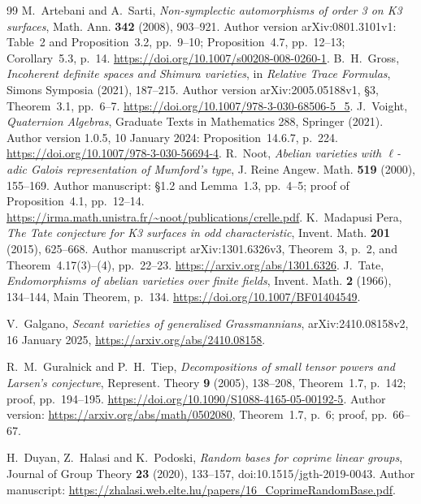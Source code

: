 \documentclass[11pt]{article}
\theoremstyle{definition}
\theoremstyle{remark}
\begin{document}
\begin{thebibliography}{99}
 M.~Artebani and A.~Sarti, \emph{Non-symplectic automorphisms of order 3 on K3 surfaces}, Math. Ann. \textbf{342} (2008), 903--921. Author version arXiv:0801.3101v1: Table~2 and Proposition~3.2, pp.~9--10; Proposition~4.7, pp.~12--13; Corollary~5.3, p.~14. \url{https://doi.org/10.1007/s00208-008-0260-1}.
 B.~H.~Gross, \emph{Incoherent definite spaces and Shimura varieties}, in \emph{Relative Trace Formulas}, Simons Symposia (2021), 187--215. Author version arXiv:2005.05188v1, \S3, Theorem~3.1, pp.~6--7. \url{https://doi.org/10.1007/978-3-030-68506-5_5}.
 J.~Voight, \emph{Quaternion Algebras}, Graduate Texts in Mathematics 288, Springer (2021). Author version 1.0.5, 10 January 2024: Proposition~14.6.7, p.~224. \url{https://doi.org/10.1007/978-3-030-56694-4}.
 R.~Noot,
\emph{Abelian varieties with $\ell$-adic Galois representation of Mumford's type},
J. Reine Angew. Math. \textbf{519} (2000), 155--169.
Author manuscript: \S1.2 and Lemma~1.3, pp.~4--5;
proof of Proposition~4.1, pp.~12--14.
\url{https://irma.math.unistra.fr/~noot/publications/crelle.pdf}.
 K.~Madapusi Pera,
\emph{The Tate conjecture for K3 surfaces in odd characteristic},
Invent. Math. \textbf{201} (2015), 625--668.
Author manuscript arXiv:1301.6326v3, Theorem~3, p.~2,
and Theorem~4.17(3)--(4), pp.~22--23.
\url{https://arxiv.org/abs/1301.6326}.
 J.~Tate,
\emph{Endomorphisms of abelian varieties over finite fields},
Invent. Math. \textbf{2} (1966), 134--144, Main Theorem, p.~134.
\url{https://doi.org/10.1007/BF01404549}.

V.~Galgano,
\emph{Secant varieties of generalised Grassmannians},
arXiv:2410.08158v2, 16 January 2025,
\url{https://arxiv.org/abs/2410.08158}.

R.~M.~Guralnick and P.~H.~Tiep,
\emph{Decompositions of small tensor powers and Larsen's conjecture},
Represent. Theory \textbf{9} (2005), 138--208,
Theorem~1.7, p.~142; proof, pp.~194--195.
\url{https://doi.org/10.1090/S1088-4165-05-00192-5}.
Author version: \url{https://arxiv.org/abs/math/0502080},
Theorem~1.7, p.~6; proof, pp.~66--67.

H.~Duyan, Z.~Halasi and K.~Podoski,
\emph{Random bases for coprime linear groups},
Journal of Group Theory \textbf{23} (2020), 133--157,
doi:10.1515/jgth-2019-0043.
Author manuscript:
\url{https://zhalasi.web.elte.hu/papers/16_CoprimeRandomBase.pdf}.



\end{thebibliography}
\end{document}

